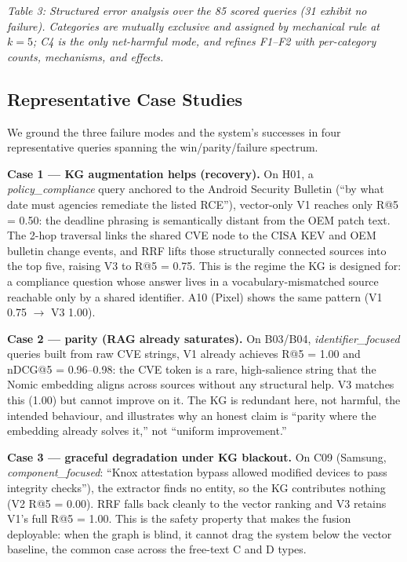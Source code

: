 \documentclass[
]{article}
\begin{document}
\emph{Table 3: Structured error analysis over the 85 scored queries
(31 exhibit no failure). Categories are mutually exclusive and assigned by
mechanical rule at $k=5$; C4 is the only net-harmful mode, and refines
F1--F2 with per-category counts, mechanisms, and effects.}

\subsection{Representative Case Studies}
\label{case-studies}

We ground the three failure modes and the system's successes in four
representative queries spanning the win/parity/failure spectrum.

\noindent\textbf{Case 1 --- KG augmentation helps (recovery).} On H01, a
\textit{policy\_compliance} query anchored to the Android Security
Bulletin (``by what date must agencies remediate the listed RCE''),
vector-only V1 reaches only R@5 = 0.50: the deadline phrasing is
semantically distant from the OEM patch text. The 2-hop traversal links
the shared CVE node to the CISA KEV and OEM bulletin change events, and
RRF lifts those structurally connected sources into the top five, raising
V3 to R@5 = 0.75. This is the regime the KG is designed for: a
compliance question whose answer lives in a vocabulary-mismatched source
reachable only by a shared identifier. A10 (Pixel) shows the same
pattern (V1 0.75 $\to$ V3 1.00).

\noindent\textbf{Case 2 --- parity (RAG already saturates).} On B03/B04,
\textit{identifier\_focused} queries built from raw CVE strings, V1
already achieves R@5 = 1.00 and nDCG@5 = 0.96--0.98: the CVE token is a
rare, high-salience string that the Nomic embedding aligns across sources
without any structural help. V3 matches this (1.00) but cannot improve on
it. The KG is redundant here, not harmful, the intended behaviour, and
illustrates why an honest claim is ``parity where the embedding already
solves it,'' not ``uniform improvement.''

\noindent\textbf{Case 3 --- graceful degradation under KG blackout.} On
C09 (Samsung, \textit{component\_focused}: ``Knox attestation bypass
allowed modified devices to pass integrity checks''), the extractor finds
no entity, so the KG contributes nothing (V2 R@5 = 0.00). RRF falls back
cleanly to the vector ranking and V3 retains V1's full R@5 = 1.00. This
is the safety property that makes the fusion deployable: when the graph
is blind, it cannot drag the system below the vector baseline, the
common case across the free-text C and D types.
\end{document}
